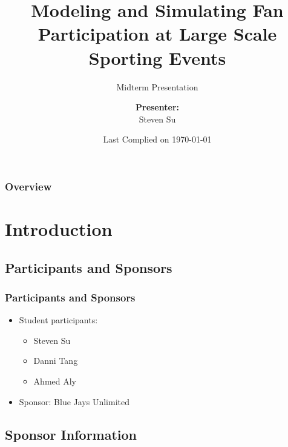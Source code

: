 \documentclass[compress,handout,10pt]{beamer}
\title{{\color{black} \LARGE Modeling and Simulating Fan Participation at Large Scale Sporting Events\newline} }
\subtitle{{\color{blue} \large Midterm Presentation} }
\author{ 
    {\bf{Presenter:}} \\ 
Steven Su \\ 
    \vspace{5pt}
}
\institute{JHU AMS 550.400 Fall 2012}
\date{\mygreen Last Complied on \today}
\let\olditem\item
\renewcommand{\item}{\setlength{\itemsep}{0.5\baselineskip}\olditem}
\begin{document}
\begin{frame}[plain]
    \titlepage
\end{frame}

\begin{frame}
    \frametitle{Overview}
    \tableofcontents
\end{frame}

\section{Introduction}

\subsection{Participants and Sponsors}

\begin{frame}
	\frametitle{Participants and Sponsors}
	\begin {itemize}
		\item Student participants:
			\begin {itemize}
				\item Steven Su
				\item Danni Tang
				\item Ahmed Aly
			\end {itemize}
		\item Sponsor: Blue Jays Unlimited	
	\end {itemize}
\end{frame}

\subsection{Sponsor Information}
\end{document}
